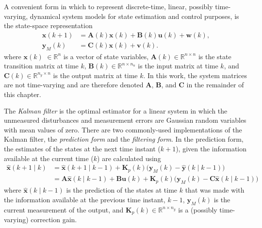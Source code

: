 A convenient form in which to represent discrete-time, linear, possibly time-varying, dynamical system models for state estimation and control purposes, is the state-space representation
\begin{equation} \label{eq:ss_rep_uwy}
	\begin{aligned}
		\mathbf{x}(k+1) &= \mathbf{A}(k) \mathbf{x}(k) + \mathbf{B}(k) \mathbf{u}(k) + \mathbf{w}(k), \\
		\mathbf{y}_M(k) &= \mathbf{C}(k) \mathbf{x}(k) + \mathbf{v}(k).
	\end{aligned}
\end{equation}
%
%
%
%
where $\mathbf{x}(k)$ $\in \mathbb{R}^n$ is a vector of state variables, $\mathbf{A}(k) \in \mathbb{R}^{n \times n}$ is the state transition matrix at time $k$, $\mathbf{B}(k) \in \mathbb{R}^{n \times n_u}$ is the input matrix at time $k$, and $\mathbf{C}(k) \in \mathbb{R}^{n_y \times n}$ is the output matrix at time $k$. In this work, the system matrices are not time-varying and are therefore denoted $\mathbf{A}$, $\mathbf{B}$, and $\mathbf{C}$ in the remainder of this chapter.

The \textit{Kalman filter} \citep{kalman_new_1960} is the optimal estimator for a linear system in which the unmeasured disturbances and measurement errors are Gaussian random variables with mean values of zero. There are two commonly-used implementations of the Kalman filter, the \textit{prediction form} and the \textit{filtering form}. In the prediction form, the estimates of the states at the next time instant ($k+1$), given the information available at the current time ($k$) are calculated using
\begin{equation}
\begin{aligned} \label{eq:xkp1_hat_p}
	\mathbf{\hat{x}}(k+1 \mid k) &= \mathbf{\hat{x}}(k+1 \mid k-1) + \mathbf{K}_p(k) \big( \mathbf{y}_M(k) - \mathbf{\hat{y}}(k \mid k-1) \big) \\
	&= \mathbf{A}\mathbf{\hat{x}}(k \mid k-1) + \mathbf{B}\mathbf{u}(k) + \mathbf{K}_p(k) \big( \mathbf{y}_M(k) - \mathbf{C} \mathbf{\hat{x}}(k \mid k-1) \big)
\end{aligned}
\end{equation}
%
where $\hat{\mathbf{x}}(k \mid k-1)$ is the prediction of the states at time $k$ that was made with the information available at the previous time instant, $k-1$, $\mathbf{y}_M(k)$ is the current measurement of the output, and $\mathbf{K}_p(k) \in \mathbb{R}^{n \times n_y}$ is a (possibly time-varying) correction gain.
%


